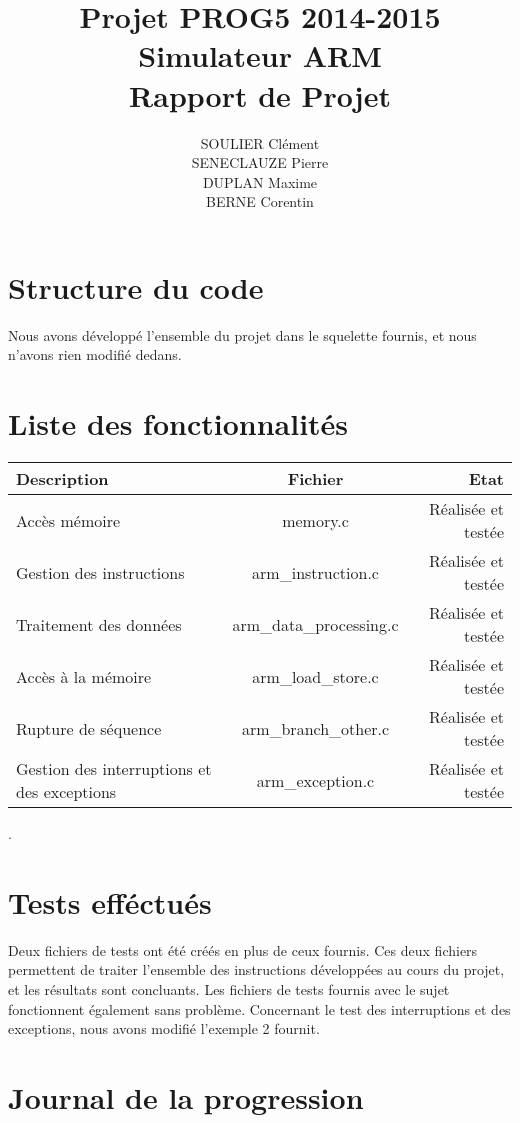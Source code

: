 \documentclass[11pt]{article} %
\title{Projet PROG5 2014-2015 \\
Simulateur ARM \\
Rapport de Projet}
\author{SOULIER Clément \\
SENECLAUZE Pierre \\
DUPLAN Maxime \\
BERNE Corentin}
\begin{document}
\sffamily
\maketitle

\newpage
\section{Structure du code}
Nous avons développé l'ensemble du projet dans le squelette fournis, et nous n'avons rien modifié dedans.

\section{Liste des fonctionnalités}

\begin{tabular}{|l|c|r|}
  \hline
  Description & Fichier & Etat\\
  \hline
  Accès mémoire & memory.c & Réalisée et testée \\
  Gestion des instructions & arm\_instruction.c & Réalisée et testée \\
  Traitement des données & arm\_data\_processing.c & Réalisée et testée\\
  Accès à la mémoire & arm\_load\_store.c & Réalisée et testée\\
  Rupture de séquence & arm\_branch\_other.c & Réalisée et testée\\
  Gestion des interruptions et des exceptions & arm\_exception.c & Réalisée et testée \\
  \hline
\end{tabular}.

\section{Tests efféctués}
Deux fichiers de tests ont été créés en plus de ceux fournis. Ces deux fichiers permettent de traiter l'ensemble des instructions développées au cours du projet, et les résultats sont concluants. Les fichiers de tests fournis avec le sujet fonctionnent également sans problème.
\newline
Concernant le test des interruptions et des exceptions, nous avons modifié l'exemple 2 fournit.
 
\section{Journal de la progression}
 
\end{document}
